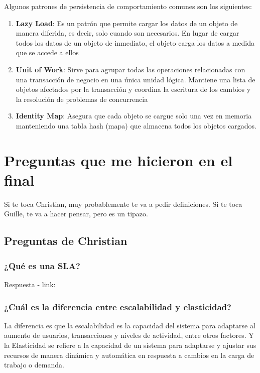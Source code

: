 \documentclass{article}
\begin{document}
		Algunos patrones de persistencia de comportamiento comunes son los siguientes:
		
			\begin{enumerate}
			\item {\textbf{Lazy Load}}: Es un patrón que permite cargar los datos de un objeto de manera diferida, es decir, solo cuando son necesarios. En lugar de cargar todos los datos de un objeto de inmediato, el objeto carga los datos a medida que se accede a ellos
			
			\item {\textbf{Unit of Work}}: Sirve para agrupar todas las operaciones relacionadas con una transacción de negocio en una única unidad lógica. Mantiene una lista de objetos afectados por la transacción y coordina la escritura de los cambios y la resolución de problemas de concurrencia
			
			
			\item {\textbf{Identity Map}}: Asegura que cada objeto se cargue solo una vez en memoria manteniendo una tabla hash (mapa) que almacena todos los objetos cargados.
			
		\end{enumerate}






  \section{Preguntas que me hicieron en el final}
  Si te toca Christian, muy probablemente te va a pedir definiciones. Si te toca Guille, te va a hacer pensar, pero es un tipazo.
   \subsection{Preguntas de Christian}
    \subsubsection{¿Qué es una SLA?}
    Respuesta - link: \textbf{~}

    \subsubsection{¿Cuál es la diferencia entre escalabilidad y elasticidad?}

    La diferencia es que la escalabilidad es la capacidad del sistema para adaptarse al aumento de usuarios, transacciones y niveles de actividad, entre otros factores. 
    Y la Elasticidad se refiere a la capacidad de un sistema para adaptarse y ajustar sus recursos de manera dinámica y automática en respuesta a cambios en la carga de trabajo o demanda.
\end{document}
